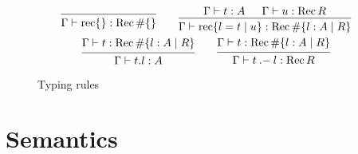 \begin{figure}
\begin{gather*}
\begin{prooftree}
      \infer0{\Gamma \vdash \RecordLit \{ \} : \RecordType \# \{ \}}
    \end{prooftree}
    \qquad
    \begin{prooftree}
      \hypo{\Gamma \vdash t : A}
      \hypo{\Gamma \vdash u : \RecordType R}
      \infer2{\Gamma \vdash \RecordLit \{ l = t \mid u \}
        : \RecordType \# \{ l : A \mid R \}}
    \end{prooftree}
    \\
    \begin{prooftree}
      \hypo{\Gamma \vdash t : \RecordType \# \{ l : A \mid R \}}
      \infer1{\Gamma \vdash t.l : A}
    \end{prooftree}
    \qquad
    \begin{prooftree}
      \hypo{\Gamma \vdash t : \RecordType \# \{ l : A \mid R \}}
      \infer1{\Gamma \vdash t\mathbin{.-}l : \RecordType R}
    \end{prooftree}
  \end{gather*}
  \caption{Typing rules}\label{fig:typing}
\end{figure}

\section{Semantics}

